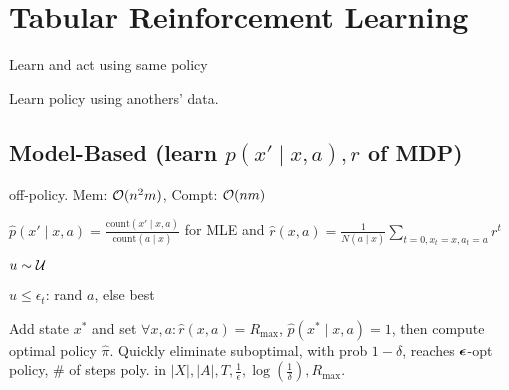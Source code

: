 \section{Tabular Reinforcement Learning}

\begin{definition}[On-Policy]
    Learn and act using same policy
\end{definition}

\begin{definition}
    Learn policy using anothers' data.
\end{definition}

\subsection{Model-Based (learn \(p(x' \mid x, a), r\) of MDP)}

off-policy.  Mem: \(\mathcal{O}(n^2m)\), Compt: \(\mathcal{O}(nm)\)

\begin{definition}[MC-Control]
    \(\hat p(x' \mid x, a) = \frac{\text{count}(x' \mid x, a)}{\text{count}(a \mid x)}\) for MLE and \(\hat r(x, a) = \frac{1}{N(a \mid x)} \sum_{t=0, x_t = x, a_t = a}r^t\)
\end{definition}

\begin{definition}
    \begin{enumerate*}
        \item \(u \sim \operatorname{\mathcal{U}}\)
        \item \(u \leq \epsilon_t\): rand \(a\), else best
    \end{enumerate*}
\end{definition}

\begin{definition}[\(\bm R_{\max}\)]
    Add state \(x^\ast\) and set \(\forall x, a: \hat r(x, a) = R_{\max}\), \(\hat p(x^* \mid x, a) = 1\), then compute optimal policy \(\hat\pi\).
    Quickly eliminate suboptimal, with prob \(1 - \delta\), reaches \(\vb*{\epsilon}\)-opt policy, \(\#\) of steps poly. in \(|X|, |A|, T, \frac{1}{\epsilon}, \log(\frac{1}{\delta}), R_{\max}\).
\end{definition}

